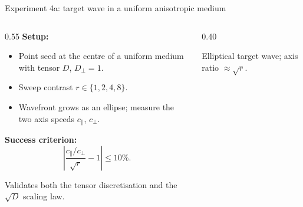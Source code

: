 \documentclass[aspectratio=169,11pt]{beamer}
\begin{document}
\begin{frame}{Experiment 4a: target wave in a uniform anisotropic medium}

\begin{columns}
\begin{column}{0.55\textwidth}
\textbf{Setup:}
\begin{itemize}
    \item Point seed at the centre of a uniform medium with tensor $D$, $D_\perp = 1$.
    \item Sweep contrast $r \in \{1, 2, 4, 8\}$.
    \item Wavefront grows as an ellipse; measure the two axis speeds $c_\parallel$, $c_\perp$.
\end{itemize}

\vspace{0.3cm}
\textbf{Success criterion:}
\[
    \left| \frac{c_\parallel / c_\perp}{\sqrt{r}} - 1 \right| \le 10\%.
\]

\vspace{0.2cm}
Validates both the tensor discretisation and the $\sqrt{D}$ scaling law.
\end{column}

\begin{column}{0.40\textwidth}
\centering
{}

\vspace{0.1cm}
{\footnotesize Elliptical target wave; axis ratio $\approx \sqrt{r}$.}
\end{column}
\end{columns}

\end{frame}
\end{document}
